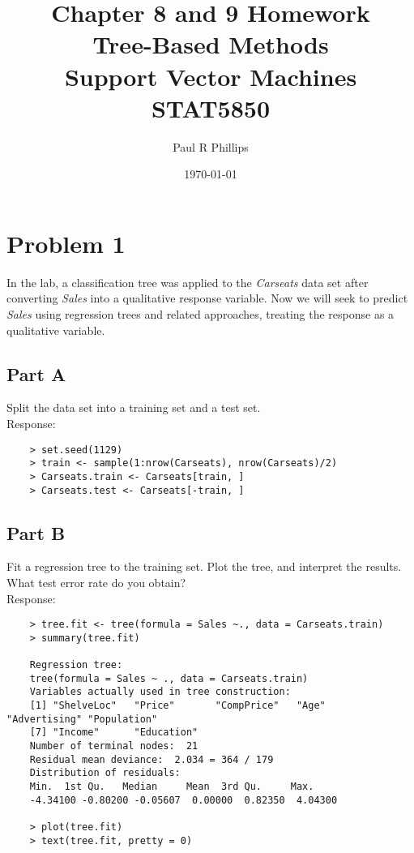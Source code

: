 \documentclass{article}
\title{Chapter 8 and 9 Homework \\ Tree-Based Methods \\ Support Vector Machines \\ STAT5850 }
\author{Paul R Phillips}
\date{\today}
\begin{document}
\maketitle
{}
\newpage
{}




\tableofcontents





\break

\section{Problem 1}
In the lab, a classification tree was applied to the \textit{Carseats} data set after converting \textit{Sales} into a qualitative response variable. Now we will seek to predict \textit{Sales} using regression trees and related approaches, treating the response as a qualitative variable. 

	\subsection{Part A}
Split the data set into a training set and a test set. \\

Response: 

\begin{verbatim}	
	> set.seed(1129)
	> train <- sample(1:nrow(Carseats), nrow(Carseats)/2)
	> Carseats.train <- Carseats[train, ]
	> Carseats.test <- Carseats[-train, ]
\end{verbatim}

	\subsection{Part B} 
Fit a regression tree to the training set. Plot the tree, and interpret the results. What test error rate do you obtain? \\

Response: 

\begin{verbatim}
	> tree.fit <- tree(formula = Sales ~., data = Carseats.train)
	> summary(tree.fit)
	
	Regression tree:
	tree(formula = Sales ~ ., data = Carseats.train)
	Variables actually used in tree construction:
	[1] "ShelveLoc"   "Price"       "CompPrice"   "Age"         "Advertising" "Population" 
	[7] "Income"      "Education"  
	Number of terminal nodes:  21 
	Residual mean deviance:  2.034 = 364 / 179 
	Distribution of residuals:
	Min.  1st Qu.   Median     Mean  3rd Qu.     Max. 
	-4.34100 -0.80200 -0.05607  0.00000  0.82350  4.04300 
	
	> plot(tree.fit)
	> text(tree.fit, pretty = 0)
\end{verbatim}
\end{document}
